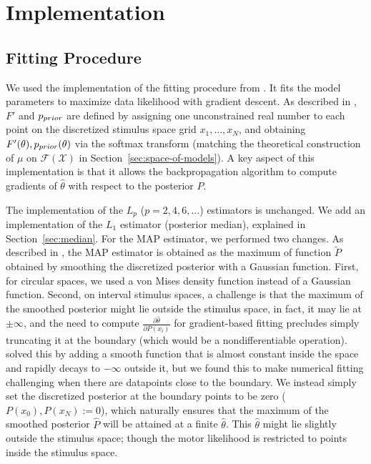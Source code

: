 



\section{Implementation}\label{sec:implementation}

\subsection{Fitting Procedure}

We used the implementation of the fitting procedure from \citet{hahn2024unifying}.
It fits the model parameters to maximize data likelihood with gradient descent.
As described in \citet{hahn2024unifying}, $F'$ and $p_{prior}$ are defined by assigning one unconstrained real number to each point on the discretized stimulus space grid $x_1, \dots, x_N$, and obtaining $F'(\theta), p_{prior}(\theta)$ via the softmax transform (matching the theoretical construction of $\mu$ on $\mathcal{F}(\mathcal{X})$ in Section~\ref{sec:space-of-models}).
A key aspect of this implementation is that it allows the backpropagation algorithm to compute gradients of $\widehat{\theta}$ with respect to the posterior $P$.

The implementation of the $L_p$ ($p=2,4,6,\dots$) estimators is unchanged.
We add an implementation of the $L_1$ estimator (posterior median), explained in Section~\ref{sec:median}.
For the MAP estimator, we performed two changes.
As described in \citet{hahn2024unifying}, the MAP estimator is obtained as the maximum of function $\tilde{P}$ obtained by smoothing the discretized posterior with a Gaussian function.
First, for circular spaces, we used a von Mises density function instead of a Gaussian function.
Second, on interval stimulus spaces, a challenge is that the maximum of the smoothed posterior might lie outside the stimulus space, in fact, it may lie at $\pm \infty$, and the need to compute $\frac{\partial \widehat{\theta}}{\partial P(x_i)}$ for gradient-based fitting precludes simply truncating it at the boundary (which would be a nondifferentiable operation). \citet{hahn2024unifying} solved this by adding a smooth function that is almost constant inside the space and rapidly decays to $-\infty$ outside it, but we found this to make numerical fitting challenging when there are datapoints close to the boundary.
We instead simply set the discretized posterior at the boundary points to be zero ($P(x_0), P(x_N) := 0$), which naturally ensures that the maximum of the smoothed posterior $\widehat{P}$ will be attained at a finite $\widehat{\theta}$. This $\widehat{\theta}$ might lie slightly outside the stimulus space; though the motor likelihood is restricted to points inside the stimulus space.

